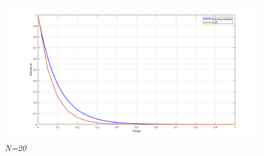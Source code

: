 \begin{figure}[H]
	\centering   
	\includegraphics[width=\textwidth]{matlab/esercizio1_stabilita2.png}
	\caption{\textit{N=20}}
\end{figure}

